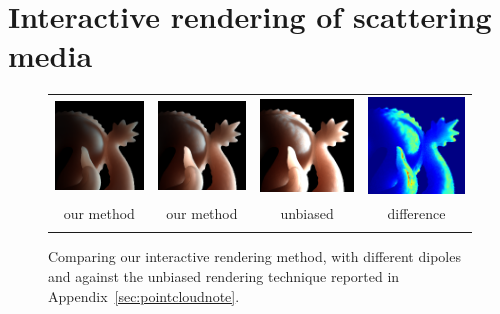 \section{Interactive rendering of scattering media}
%
\begin{figure}[t]
\begin{tabular}{@{}c@{}c@{}c@{}c@{}}
\includegraphics[width=0.27\columnwidth]{figures/difference/dragon_shampoo_jensen} &
\includegraphics[width=0.27\columnwidth]{figures/difference/diff_dr_ours_small} &
\includegraphics[width=0.27\columnwidth]{figures/difference/diff_dr_ref_small} &
\includegraphics[width=0.27\columnwidth]{figures/difference/diff_dr_diff_small} \\ 
our method & our method & unbiased & difference  \\
\cite{Jensen2001} & \cite{Frisvad2014} & \cite{Frisvad2014} &  \\
\end{tabular}
\caption{Comparing our interactive rendering method, with different dipoles and against the unbiased rendering technique reported in Appendix~\ref{sec:pointcloudnote}.}
\label{fig:interactivediff}
\end{figure}
